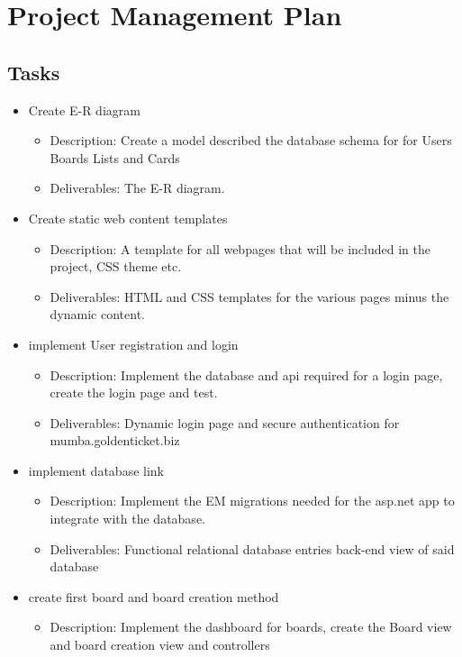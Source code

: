 \documentclass[letterpaper]{article}
\begin{document}
\pagebreak
\section{Project Management Plan}

\subsection{Tasks}
\begin{itemize}
  \item Create E-R diagram
  \begin{itemize}
    \item Description: Create a model described the database schema for for Users Boards Lists and Cards
    \item Deliverables: The E-R diagram.
  \end{itemize}
  \item Create static web content templates
  \begin{itemize}
    \item Description: A template for all webpages that will be included in the project, CSS theme etc.
    \item Deliverables: HTML and CSS templates for the various pages minus the dynamic content.
  \end{itemize}
  \item implement User registration and login
  \begin{itemize}
    \item Description: Implement the database and api required for a login page, create the login page and test.
    \item Deliverables: Dynamic login page and secure authentication for mumba.goldenticket.biz
  \end{itemize}
  \item implement database link
  \begin{itemize}
    \item Description: Implement the EM migrations needed for the asp.net app to integrate with the database.
    \item Deliverables: Functional relational database entries back-end view of said database
  \end{itemize}
  \item create first board and board creation method
  \begin{itemize}
    \item Description: Implement the dashboard for boards, create the Board view and board creation view and controllers

\end{itemize}
\end{itemize}
\end{document}
